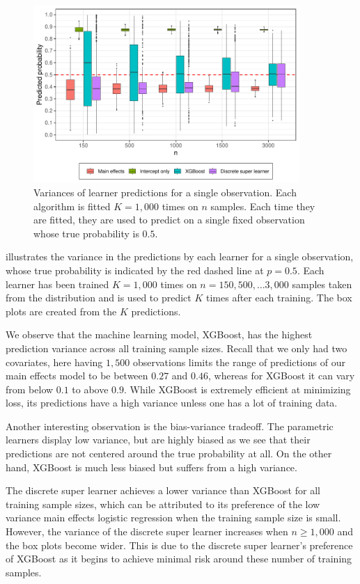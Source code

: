 \documentclass[./main.tex]{subfiles}
\begin{document}
\begin{figure}[H]
    \centering
    \includegraphics[width=0.9\textwidth]{figures/learner_vars_1000.pdf}
    \caption{Variances of learner predictions for a single observation. Each algorithm is fitted $ K = 1,000 $ times on $n$ samples. Each time they are fitted, they are used to predict on a single fixed observation whose true probability is $ 0.5 $.}
    \label{fig:pred_probs_boxplot}
\end{figure}
 illustrates the variance in the predictions by each learner for a single observation, whose true probability is indicated by the red dashed line at $ p = 0.5 $. Each learner has been trained $ K = 1,000 $ times on $ n = 150, 500, \dots 3,000 $ samples taken from the distribution and is used to predict $ K $ times after each training. The box plots are created from the $ K $ predictions. 

We observe that the machine learning model, XGBoost, has the highest prediction variance across all training sample sizes. Recall that we only had two covariates, here having $ 1,500 $ observations limits the range of predictions of our main effects model to be between $ 0.27 $ and $ 0.46 $, whereas for XGBoost it can vary from below $ 0.1 $ to above $ 0.9 $. While XGBoost is extremely efficient at minimizing loss, its predictions have a high variance unless one has a lot of training data.

Another interesting observation is the bias-variance tradeoff. The parametric learners display low variance, but are highly biased as we see that their predictions are not centered around the true probability at all. On the other hand, XGBoost is much less biased but suffers from a high variance.

The discrete super learner achieves a lower variance than XGBoost for all training sample sizes, which can be attributed to its preference of the low variance main effects logistic regression when the training sample size is small. However, the variance of the discrete super learner increases when $ n \geq 1,000 $ and the box plots become wider. This is due to the discrete super learner's preference of XGBoost as it begins to achieve minimal risk around these number of training samples. 
\end{document}
